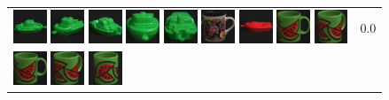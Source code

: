 \begin{figure}[!bp]
\begin{tabular}{m{11cm} | m{3cm} |}
\includegraphics[width=1cm]{coil/beeld-55.eps}
\includegraphics[width=1cm]{coil/beeld-57.eps}
\includegraphics[width=1cm]{coil/beeld-58.eps}
\includegraphics[width=1cm]{coil/beeld-56.eps}
\includegraphics[width=1cm]{coil/beeld-59.eps}
\includegraphics[width=1cm]{coil/beeld-60.eps}
\includegraphics[width=1cm]{coil/beeld-18.eps}
\includegraphics[width=1cm]{coil/beeld-30.eps}
\includegraphics[width=1cm]{coil/beeld-33.eps}
& {\scriptsize 0.0}
\\
\includegraphics[width=1cm]{coil/beeld-30.eps}
\includegraphics[width=1cm]{coil/beeld-33.eps}
\includegraphics[width=1cm]{coil/beeld-32.eps}

\end{tabular}
\end{figure}
